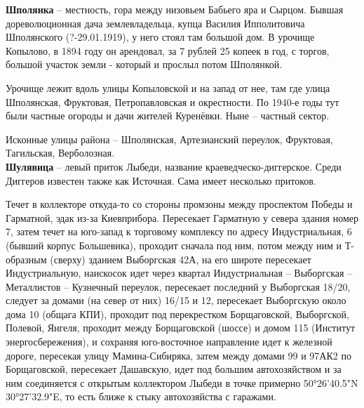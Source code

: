 \textbf{Шполянка} – местность, гора между низовьем Бабьего яра и Сырцом. Бывшая дореволюционная дача землевладельца, купца Василия Ипполитовича Шполянского (?-29.01.1919), у него стоял там большой дом. В урочище Копылово, в 1894 году он арендовал, за 7 рублей 25 копеек в год, с торгов, большой участок земли - который и прослыл потом Шполянкой.

Урочище лежит вдоль улицы Копыловской и на запад от нее, там где улица Шполянская, Фруктовая, Петропавловская и окрестности. По 1940-е годы тут были частные огороды и дачи жителей Куренёвки. Ныне – частный сектор.

Исконные улицы района – Шполянская, Артезианский переулок, Фруктовая, Тагильская, Верболозная.\\

\textbf{Шулявица} – левый приток Лыбеди, название краеведческо-диггерское. Среди Диггеров известен также как Источная. Сама имеет нес\-колько притоков.

Течет в коллекторе откуда-то со стороны промзоны между проспектом Победы и Гарматной, эдак из-за Киевприбора. Пересекает Гарматную у севера здания номер 7, затем течет на юго-запад к торговому комплексу по адресу Индустриальная, 6 (бывший корпус Большевика), проходит сначала под ним, потом между ним и Т-образным (сверху) зданием Выборгская 42А, на его широте пересекает Индус\-триальную, наискосок идет через квартал Ин\-дустриальная – Выборгская – Металлистов – Кузнечный переулок, пересекает последний у Выборгская 18/20, следует за домами (на север от них) 16/15 и 12, пересекает Выборгскую около дома 10 (общага КПИ), проходит под перекрестком Борщаговской, Выборгской, Полевой, Янгеля, проходит между Борщаговской (шоссе) и домом 115 (Институт энергосбережения), и сохраняя юго-восточное направление идет к железной дороге, пересекая улицу Мамина-Сибиряка, затем между домами 99 и 97АК2 по Борщаговской, пересекает Дашавскую, идет под большим автохозяйством и за ним соединяется с открытым коллектором Лыбеди в точке примерно 50°26'40.5"N 30°27'32.9"E, то есть ближе к стыку автохозяйства с гаражами.\\


